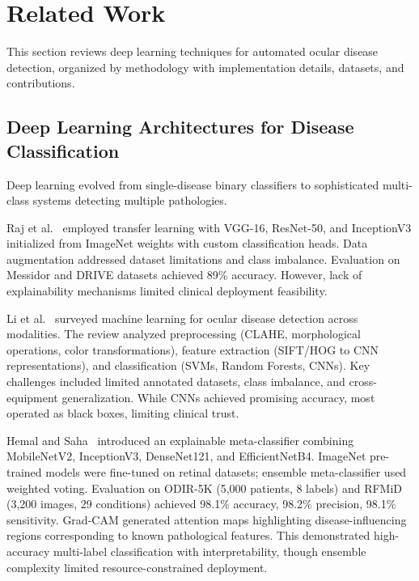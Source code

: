 


\section{Related Work}
\label{sec:related}

This section reviews deep learning techniques for automated ocular disease detection, organized by methodology with implementation details, datasets, and contributions.

\subsection{Deep Learning Architectures for Disease Classification}

Deep learning evolved from single-disease binary classifiers to sophisticated multi-class systems detecting multiple pathologies.

Raj et al.~\cite{R1} employed transfer learning with VGG-16, ResNet-50, and InceptionV3 initialized from ImageNet weights with custom classification heads. Data augmentation addressed dataset limitations and class imbalance. Evaluation on Messidor and DRIVE datasets achieved 89\% accuracy. However, lack of explainability mechanisms limited clinical deployment feasibility.

Li et al.~\cite{R2} surveyed machine learning for ocular disease detection across modalities. The review analyzed preprocessing (CLAHE, morphological operations, color transformations), feature extraction (SIFT/HOG to CNN representations), and classification (SVMs, Random Forests, CNNs). Key challenges included limited annotated datasets, class imbalance, and cross-equipment generalization. While CNNs achieved promising accuracy, most operated as black boxes, limiting clinical trust.

Hemal and Saha~\cite{R10} introduced an explainable meta-classifier combining MobileNetV2, InceptionV3, DenseNet121, and EfficientNetB4. ImageNet pre-trained models were fine-tuned on retinal datasets; ensemble meta-classifier used weighted voting. Evaluation on ODIR-5K (5,000 patients, 8 labels) and RFMiD (3,200 images, 29 conditions) achieved 98.1\% accuracy, 98.2\% precision, 98.1\% sensitivity. Grad-CAM generated attention maps highlighting disease-influencing regions corresponding to known pathological features. This demonstrated high-accuracy multi-label classification with interpretability, though ensemble complexity limited resource-constrained deployment.

